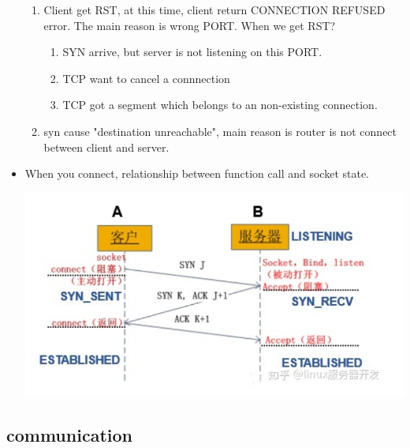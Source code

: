 \documentclass[a4paper,11pt,twoside]{book}
\begin{document}
\begin{itemize}
\begin{enumerate}
		\item Client get RST, at this time, client return CONNECTION REFUSED error.  The main reason is wrong PORT.  When we get RST?
		\begin{enumerate}
			\item SYN arrive, but server is not listening on this PORT. 
			\item TCP want to cancel a connnection
			\item TCP got a segment which belongs to an non-existing connection.
		\end{enumerate}
		\item syn cause "destination unreachable", main reason is router is not connect between client and server.
	\end{enumerate}
	
		\item When you connect, relationship between function call and socket state.
	
	\begin{center}
		\includegraphics[width=0.66\linewidth]{pics/tcp1.png}
	\end{center}
	
\end{itemize}

\subsection{communication}
\end{document}
